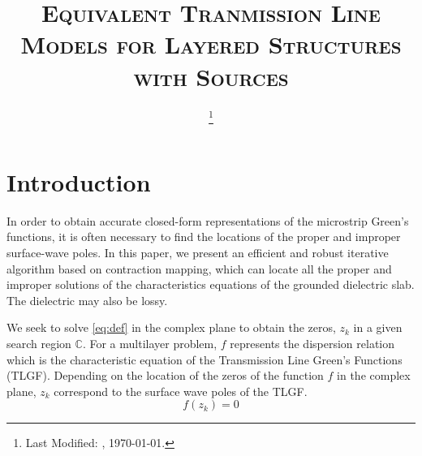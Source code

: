 \documentclass[12pt]{article}
\begin{document}
\title{\textsc{Equivalent Tranmission Line Models for Layered Structures with Sources}\\}
\date{\footnote{Last Modified: \currenttime, \today.}}
\maketitle
%
%
%
\section{Introduction}
%
In order to obtain accurate closed-form representations of the microstrip Green’s functions, it is often necessary to find the locations of the proper and improper surface-wave poles. In this paper, we present an efficient and robust iterative algorithm based on contraction mapping, which can locate all the proper and improper solutions of the characteristics equations of the grounded dielectric slab. The dielectric may also be lossy.

We seek to solve \eqref{eq:def} in the complex plane to obtain the zeros, $z_k$ in a given search region $\mathbb{C}$. For a multilayer problem, $f$ represents the dispersion relation which is the characteristic equation of the Transmission Line Green's Functions (TLGF). Depending on the location of the zeros of the function $f$ in the complex plane, $z_k$ correspond to the surface wave poles of the TLGF.
\begin{equation}
  f(z_k) = 0
  \label{eq:def}
\end{equation}
\end{document}
